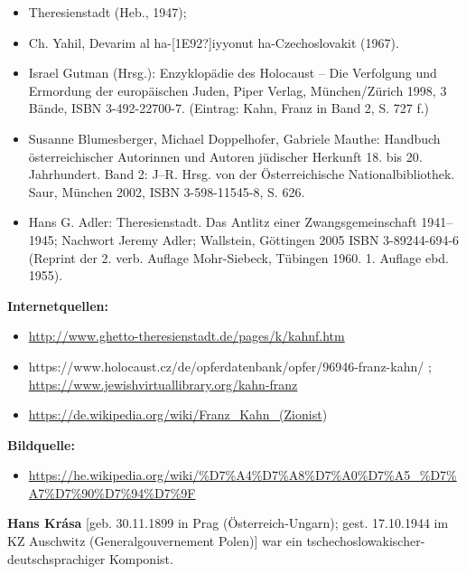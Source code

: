 \documentclass[a4paper]{article}
\begin{document}
\begin{itemize}
\item Theresienstadt (Heb., 1947); 
\item Ch. Yahil, Devarim al ha-[1E92?]iyyonut ha-Czechoslovakit (1967).
\item Israel Gutman (Hrsg.): Enzyklopädie des Holocaust – Die Verfolgung und Ermordung der europäischen Juden, Piper
Verlag, München/Zürich 1998, 3 Bände, ISBN 3-492-22700-7. (Eintrag: Kahn, Franz in Band 2, S. 727 f.)  
\item Susanne Blumesberger, Michael Doppelhofer, Gabriele Mauthe: Handbuch österreichischer Autorinnen und Autoren
jüdischer Herkunft 18. bis 20. Jahrhundert. Band 2: J–R. Hrsg. von der Österreichische Nationalbibliothek. Saur,
München 2002, ISBN 3-598-11545-8, S. 626.  
\item Hans G. Adler: Theresienstadt. Das Antlitz einer Zwangsgemeinschaft 1941–1945; Nachwort Jeremy Adler; Wallstein,
Göttingen 2005 ISBN 3-89244-694-6 (Reprint der 2. verb. Auflage Mohr-Siebeck, Tübingen 1960. 1. Auflage ebd. 1955).
\end{itemize}

\bigskip

\textbf{Internetquellen:}

\begin{itemize}
\item \url{http://www.ghetto-theresienstadt.de/pages/k/kahnf.htm} 
\item https://www.holocaust.cz/de/opferdatenbank/opfer/96946-franz-kahn/ ;
\url{https://www.jewishvirtuallibrary.org/kahn-franz} 
\item \url{https://de.wikipedia.org/wiki/Franz_Kahn_(Zionist}) 
\end{itemize}

\bigskip

\textbf{Bildquelle:}

\begin{itemize}
\item \url{https://he.wikipedia.org/wiki/%D7%A4%D7%A8%D7%A0%D7%A5_%D7%A7%D7%90%D7%94%D7%9F} 
\end{itemize}
\textbf{Hans Krása} [geb. 30.11.1899 in Prag (Österreich-Ungarn); gest. 17.10.1944 im KZ Auschwitz (Generalgouvernement
Polen)] war ein tschechoslowakischer-deutschsprachiger Komponist.
\end{document}
